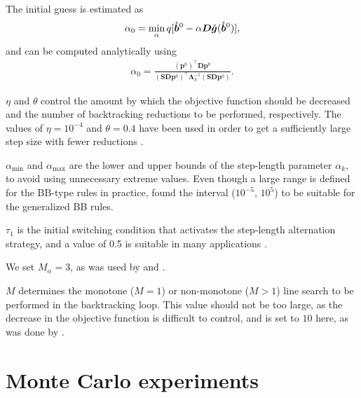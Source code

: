 \documentclass[11pt]{article}
\newcommand{\0}{\phantom{0}}
\begin{document}
\begin{compactitem}
	      The initial guess is estimated as
	      \begin{align*}
		      \alpha_{0} = \operatornamewithlimits{min}_{\alpha} q[\mathring{\bm{b}}^{0} - \alpha \bm{D} \mathring{\bm{g}}(\mathring{\bm{b}}^{0})],
	      \end{align*}
	      and can be computed analytically using
	      \begin{align*}
		      \alpha_{0} = \frac{(\bm{p}^{0})^\top\bm{D}\bm{p}^{0}}{(\bm{S}\bm{D}\bm{p}^{0})^\top\bm{\Lambda}_{h}^{-1}(\bm{S}\bm{D}\bm{p}^{0})}.
	      \end{align*}
	\item $\eta$ and $\theta$ control the amount by which the objective function should be decreased and the number of backtracking reductions to be performed, respectively. The values of $\eta = 10^{-4}$ and $\theta = 0.4$ have been used in order to get a sufficiently large step size with fewer reductions \citep{Bonettini2009}.
	\item $\alpha_{\text{min}}$ and $\alpha_{\text{max}}$ are the lower and upper bounds of the step-length parameter $\alpha_{k},$ to avoid using unnecessary extreme values. Even though a large range is defined for the BB-type rules in practice, \citet{Bertero2013} found the interval ($10^{-5}$, $10^{5}$) to be suitable for the generalized BB rules.
	\item $\tau_{1}$ is the initial switching condition that activates the step-length alternation strategy, and a value of 0.5 is suitable in many applications \citep{Bonettini2009, Bertero2013}.
	\item We set $M_{\alpha} = 3$, as was used by \citet{Bonettini2009} and \citet{Bertero2013}.
	\item $M$ determines the monotone ($M =1$) or non-monotone ($M > 1$) line search to be performed in the backtracking loop. This value should not be too large, as the decrease in the objective function is difficult to control, and is set to $10$ here, as was done by \citet{Bonettini2009}.
\end{compactitem}

\section{Monte Carlo experiments}
\label{sec:MCNN}
\end{document}
